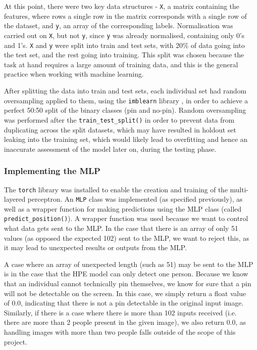 \documentclass[a4paper, oneside, 11pt]{article}
\begin{document}
\bigskip
\noindent
At this point, there were two key data structures - \texttt{X}, a matrix containing the features, where rows a single row in the matrix corresponds with a single row of the dataset, and \texttt{y}, an array of the corresponding labels. Normalisation was carried out on \texttt{X}, but not \texttt{y}, since \texttt{y} was already normalised, containing only 0's and 1's. \texttt{X} and \texttt{y} were split into train and test sets, with 20\% of data going into the test set, and the rest going into training. This split was chosen because the task at hand requires a large amount of training data, and this is the general practice when working with machine learning.

\bigskip
\noindent
After splitting the data into train and test sets, each individual set had random oversampling applied to them, using the \texttt{imblearn} library \cite{imbalancedlearn}, in order to achieve a perfect 50:50 split of the binary classes (pin and no-pin). Random oversampling was performed after the \texttt{train\_test\_split()} in order to prevent data from duplicating across the split datasets, which may have resulted in holdout set leaking into the training set, which would likely lead to overfitting and hence an inaccurate assessment of the model later on, during the testing phase. 

\subsubsection{Implementing the MLP}

The \texttt{torch} library was installed to enable the creation and training of the multi-layered perceptron. An \texttt{MLP} class was implemented (as specified previously), as well as a wrapper function for making predictions using the MLP class (called \texttt{predict\_position()}). A wrapper function was used because we want to control what data gets sent to the MLP. In the case that there is an array of only 51 values (as opposed the expected 102) sent to the MLP, we want to reject this, as it may lead to unexpected results or outputs from the MLP.

\bigskip
\noindent
A case where an array of unexpected length (such as 51) may be sent to the MLP is in the case that the HPE model can only detect one person. Because we know that an individual cannot technically pin themselves, we know for sure that a pin will not be detectable on the screen. In this case, we simply return a float value of 0.0, indicating that there is not a pin detectable in the original input image. Similarly, if there is a case where there is more than 102 inputs received (i.e. there are more than 2 people present in the given  image), we also return 0.0, as handling images with more than two people falls outside of the scope of this project.
\end{document}
